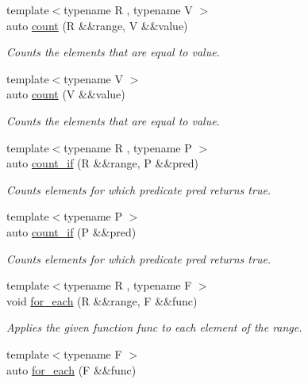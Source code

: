 \begin{DoxyCompactItemize}
{\footnotesize template$<$typename R , typename V $>$ }\\auto \mbox{\hyperlink{namespace_r_a_h___n_a_m_e_s_p_a_c_e_a7c7b2627a4cd1c0877ea39d0b1bae608}{count}} (R \&\&range, V \&\&value)
\begin{DoxyCompactList}\small\item\em Counts the elements that are equal to value. \end{DoxyCompactList}\item 
{\footnotesize template$<$typename V $>$ }\\auto \mbox{\hyperlink{namespace_r_a_h___n_a_m_e_s_p_a_c_e_ae85f193e93d3512d1cb2d62fbbe02d8c}{count}} (V \&\&value)
\begin{DoxyCompactList}\small\item\em Counts the elements that are equal to value. \end{DoxyCompactList}\item 
{\footnotesize template$<$typename R , typename P $>$ }\\auto \mbox{\hyperlink{namespace_r_a_h___n_a_m_e_s_p_a_c_e_aaac05baef6d97b6f141ff91efc955f76}{count\+\_\+if}} (R \&\&range, P \&\&pred)
\begin{DoxyCompactList}\small\item\em Counts elements for which predicate pred returns true. \end{DoxyCompactList}\item 
{\footnotesize template$<$typename P $>$ }\\auto \mbox{\hyperlink{namespace_r_a_h___n_a_m_e_s_p_a_c_e_a8bb881e74f4e82fb751ac6fca7859f36}{count\+\_\+if}} (P \&\&pred)
\begin{DoxyCompactList}\small\item\em Counts elements for which predicate pred returns true. \end{DoxyCompactList}\item 
{\footnotesize template$<$typename R , typename F $>$ }\\void \mbox{\hyperlink{namespace_r_a_h___n_a_m_e_s_p_a_c_e_a81222de7a8a2ef5d8dfb40733190a573}{for\+\_\+each}} (R \&\&range, F \&\&func)
\begin{DoxyCompactList}\small\item\em Applies the given function func to each element of the range. \end{DoxyCompactList}\item 
{\footnotesize template$<$typename F $>$ }\\auto \mbox{\hyperlink{namespace_r_a_h___n_a_m_e_s_p_a_c_e_ad6981e8b11a89660367386b77cb9e98e}{for\+\_\+each}} (F \&\&func)

\end{DoxyCompactItemize}
